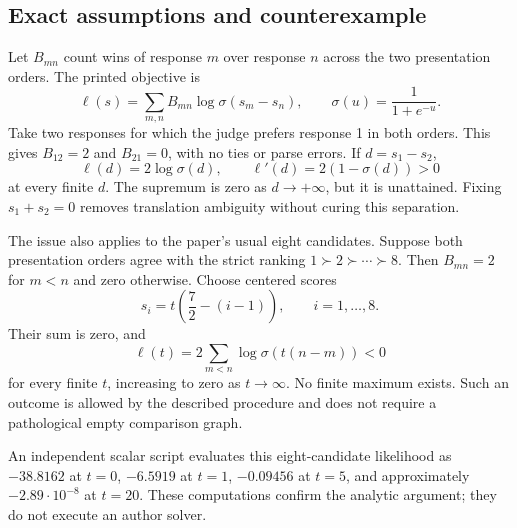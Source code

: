 \documentclass[10pt]{article}
\begin{document}
\subsection*{Exact assumptions and counterexample}
Let \(B_{mn}\) count wins of response \(m\) over response \(n\) across the two presentation orders. The printed objective is \[\ell(s)=\sum_{m,n}B_{mn}\log\sigma(s_m-s_n),\qquad
 \sigma(u)=\frac{1}{1+e^{-u}}.\] Take two responses for which the judge prefers response 1 in both orders. This gives \(B_{12}=2\) and \(B_{21}=0\), with no ties or parse errors. If \(d=s_1-s_2\), \[\ell(d)=2\log\sigma(d),\qquad
 \ell'(d)=2(1-\sigma(d))>0\] at every finite \(d\). The supremum is zero as \(d\to+\infty\), but it is unattained. Fixing \(s_1+s_2=0\) removes translation ambiguity without curing this separation.\par
The issue also applies to the paper’s usual eight candidates. Suppose both presentation orders agree with the strict ranking \(1\succ2\succ\cdots\succ8\). Then \(B_{mn}=2\) for \(m<n\) and zero otherwise. Choose centered scores \[s_i=t\left(\frac72-(i-1)\right),\qquad i=1,\ldots,8.\] Their sum is zero, and \[\ell(t)=2\sum_{m<n}\log\sigma(t(n-m))<0\] for every finite \(t\), increasing to zero as \(t\to\infty\). No finite maximum exists. Such an outcome is allowed by the described procedure and does not require a pathological empty comparison graph.\par
An independent scalar script evaluates this eight-candidate likelihood as \(-38.8162\) at \(t=0\), \(-6.5919\) at \(t=1\), \(-0.09456\) at \(t=5\), and approximately \(-2.89\cdot10^{-8}\) at \(t=20\). These computations confirm the analytic argument; they do not execute an author solver.\par
\end{document}
